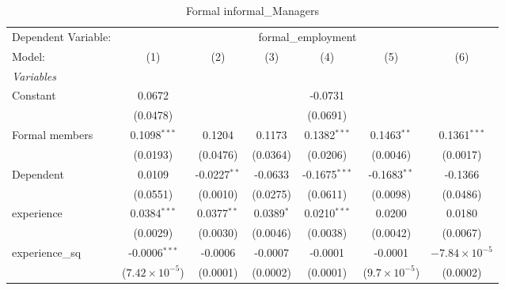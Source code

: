 \begin{table}[htbp]
   \caption{Formal informal\_Managers}
   \centering
   \begin{adjustbox}{width = \textwidth, center}
      \begin{tabular}{lcccccc}
         \tabularnewline \midrule \midrule
         Dependent Variable: & \multicolumn{6}{c}{formal\_employment}\\
         Model:                    & (1)                     & (2)            & (3)          & (4)             & (5)                    & (6)\\  
         \midrule
         \emph{Variables}\\
         Constant                  & 0.0672                  &                &              & -0.0731         &                        &   \\   
                                   & (0.0478)                &                &              & (0.0691)        &                        &   \\   
         Formal members            & 0.1098$^{***}$          & 0.1204         & 0.1173       & 0.1382$^{***}$  & 0.1463$^{**}$          & 0.1361$^{***}$\\   
                                   & (0.0193)                & (0.0476)       & (0.0364)     & (0.0206)        & (0.0046)               & (0.0017)\\   
         Dependent                 & 0.0109                  & -0.0227$^{**}$ & -0.0633      & -0.1675$^{***}$ & -0.1683$^{**}$         & -0.1366\\   
                                   & (0.0551)                & (0.0010)       & (0.0275)     & (0.0611)        & (0.0098)               & (0.0486)\\   
         experience                & 0.0384$^{***}$          & 0.0377$^{**}$  & 0.0389$^{*}$ & 0.0210$^{***}$  & 0.0200                 & 0.0180\\   
                                   & (0.0029)                & (0.0030)       & (0.0046)     & (0.0038)        & (0.0042)               & (0.0067)\\   
         experience\_sq            & -0.0006$^{***}$         & -0.0006        & -0.0007      & -0.0001         & -0.0001                & $-7.84\times 10^{-5}$\\    
                                   & ($7.42\times 10^{-5}$)  & (0.0001)       & (0.0002)     & (0.0001)        & ($9.7\times 10^{-5}$)  & (0.0002)\\   

\end{tabular}
\end{adjustbox}
\end{table}
